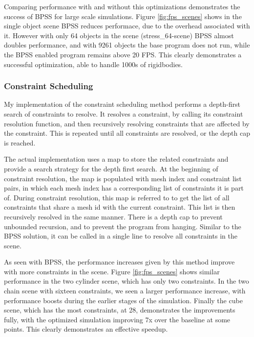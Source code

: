 \documentclass[11pt,a4paper]{article}
\begin{document}
Comparing performance with and without this optimizations demonstrates the success of BPSS for large scale simulations. 
Figure \ref{fig:fps_scenes} shows in the single object scene BPSS reduces performace, due to the overhead associated with it.
However with only 64 objects in the scene (stress\_64-scene) BPSS almost doubles performance, and with 9261 objects the base program does not run, while the BPSS enabled program remains above 20 FPS. 
This clearly demonstrates a successful optimization, able to handle 1000s of rigidbodies. 


\subsubsection*{Constraint Scheduling}

My implementation of the constraint scheduling method performs a depth-first search of constraints to resolve.
It resolves a constraint, by calling its constraint resolution function, and then recursively resolving constraints that are affected by the constraint. 
This is repeated until all constraints are resolved, or the depth cap is reached.

The actual implementation uses a map to store the related constraints and provide a search strategy for the depth first search.
At the beginning of constraint resolution, the map is populated with mesh index and constraint list pairs, in which each mesh index has a corresponding list of constraints it is part of. 
During constraint resolution, this map is referred to to get the list of all constraints that share a mesh id with the current constraint. 
This list is then recursively resolved in the same manner.
There is a depth cap to prevent unbounded recursion, and to prevent the program from hanging. 
Similar to the BPSS solution, it can be called in a single line to resolve all constraints in the scene.

As seen with BPSS, the performance increases given by this method improve with more constraints in the scene.
Figure \ref{fig:fps_scenes} shows similar performance in the two cylinder scene, which has only two constraints. 
In the two chain scene with sixteen constraints, we seen a larger performance increase, with performance boosts during the earlier stages of the simulation. 
Finally the cube scene, which has the most constraints, at 28, demonstrates the improvements fully, with the optimized simulation improving 7x over the baseline at some points. 
This clearly demonstrates an effective speedup. 
\end{document}
